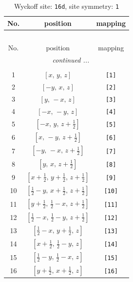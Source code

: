 \documentclass[fleqn,8pt]{jsarticle}
\begin{document}
\begin{longtable}{ccc}
\caption{Wyckoff site: {\tt 16d}, site symmetry: {\tt 1}}
 \\
 \hline \hline
No. & position & mapping \\ \hline \endfirsthead

\multicolumn{2}{l}{\tablename\ \thetable{}} \\
 \hline \hline
No. & position & mapping \\ \hline \endhead

 \hline \hline
\multicolumn{2}{r}{\footnotesize\it continued ...} \\ \endfoot

 \hline \hline
\multicolumn{2}{r}{} \\ \endlastfoot

1 & $\left[ x,\, y,\, z \right]$ & {\tt [1]} \\ \hline
2 & $\left[ - y,\, x,\, z \right]$ & {\tt [2]} \\ \hline
3 & $\left[ y,\, - x,\, z \right]$ & {\tt [3]} \\ \hline
4 & $\left[ - x,\, - y,\, z \right]$ & {\tt [4]} \\ \hline
5 & $\left[ - x,\, y,\, z + \frac{1}{2} \right]$ & {\tt [5]} \\ \hline
6 & $\left[ x,\, - y,\, z + \frac{1}{2} \right]$ & {\tt [6]} \\ \hline
7 & $\left[ - y,\, - x,\, z + \frac{1}{2} \right]$ & {\tt [7]} \\ \hline
8 & $\left[ y,\, x,\, z + \frac{1}{2} \right]$ & {\tt [8]} \\ \hline
9 & $\left[ x + \frac{1}{2},\, y + \frac{1}{2},\, z + \frac{1}{2} \right]$ & {\tt [9]} \\ \hline
10 & $\left[ \frac{1}{2} - y,\, x + \frac{1}{2},\, z + \frac{1}{2} \right]$ & {\tt [10]} \\ \hline
11 & $\left[ y + \frac{1}{2},\, \frac{1}{2} - x,\, z + \frac{1}{2} \right]$ & {\tt [11]} \\ \hline
12 & $\left[ \frac{1}{2} - x,\, \frac{1}{2} - y,\, z + \frac{1}{2} \right]$ & {\tt [12]} \\ \hline
13 & $\left[ \frac{1}{2} - x,\, y + \frac{1}{2},\, z \right]$ & {\tt [13]} \\ \hline
14 & $\left[ x + \frac{1}{2},\, \frac{1}{2} - y,\, z \right]$ & {\tt [14]} \\ \hline
15 & $\left[ \frac{1}{2} - y,\, \frac{1}{2} - x,\, z \right]$ & {\tt [15]} \\ \hline
16 & $\left[ y + \frac{1}{2},\, x + \frac{1}{2},\, z \right]$ & {\tt [16]} \\
\end{longtable}
\end{document}
